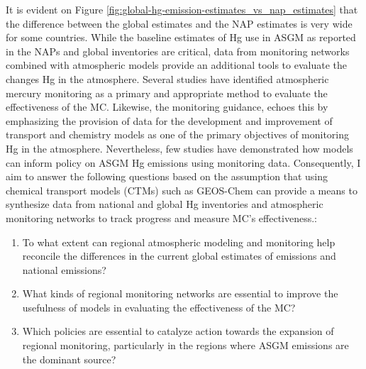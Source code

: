 \begin{flushleft}
 It is evident on Figure \ref{fig:global-hg-emission-estimates_vs_nap_estimates} that the difference between the global estimates and the NAP estimates is very wide for some countries. While the baseline estimates of Hg use in ASGM as reported in the NAPs and global inventories are critical, data from monitoring networks combined with atmospheric models provide an additional tools to evaluate the changes Hg in the atmosphere. Several studies have identified atmospheric mercury monitoring as a primary and appropriate method to evaluate the effectiveness of the MC\cite{sprovieri_atmospheric_2016,evers_evaluating_2016,gustin_measuring_2015,united_nations_environment_programme_technical_2019}. Likewise, the monitoring guidance,\cite{unep_guidance_2021} echoes this by emphasizing the provision of data for the development and improvement of transport and chemistry models as one of the primary objectives of monitoring Hg in the atmosphere. Nevertheless, few studies have demonstrated how models can inform policy on ASGM Hg emissions using monitoring data. Consequently, I aim to answer the following questions based on the assumption that using chemical transport models (CTMs) such as GEOS-Chem can provide a means to synthesize data from national and global Hg inventories and atmospheric monitoring networks to track progress and measure MC's effectiveness.:
\begin{enumerate}
  \item To what extent can regional atmospheric modeling and monitoring help reconcile the differences in the current global estimates of emissions and national emissions?
  \item What kinds of regional monitoring networks are essential to improve the usefulness of models in evaluating the effectiveness of the MC?
  \item Which policies are essential to catalyze action towards the expansion of regional monitoring, particularly in the regions where ASGM emissions are the dominant source?
\end{enumerate}
\end{flushleft}



